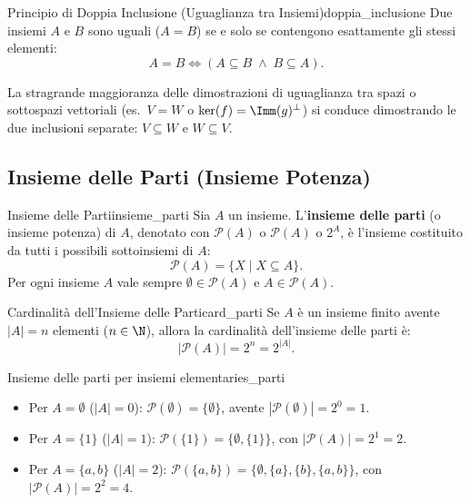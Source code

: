 \begin{teorema}{Principio di Doppia Inclusione (Uguaglianza tra Insiemi)}{doppia_inclusione}
Due insiemi $A$ e $B$ sono uguali ($A = B$) se e solo se contengono esattamente gli stessi elementi:
\begin{equation}
    A = B \iff (A \subseteq B \;\land\; B \subseteq A).
\end{equation}
\end{teorema}
\begin{osservazione}
La stragrande maggioranza delle dimostrazioni di uguaglianza tra spazi o sottospazi vettoriali (es.~$V = W$ o $\ker(f) = \Imm(g)^{\perp}$) si conduce dimostrando le due inclusioni separate: $V \subseteq W$ e $W \subseteq V$.
\end{osservazione}

\subsection{Insieme delle Parti (Insieme Potenza)}

\begin{definizione}{Insieme delle Parti}{insieme_parti}
Sia $A$ un insieme. L'\textbf{insieme delle parti} (o insieme potenza) di $A$, denotato con $\mathcal{P}(A)$ o $\mathscr{P}(A)$ o $2^A$, è l'insieme costituito da tutti i possibili sottoinsiemi di $A$:
\begin{equation}
    \mathcal{P}(A) = \{X \mid X \subseteq A\}.
\end{equation}
Per ogni insieme $A$ vale sempre $\emptyset \in \mathcal{P}(A)$ e $A \in \mathcal{P}(A)$.
\end{definizione}

\begin{proposizione}{Cardinalità dell'Insieme delle Parti}{card_parti}
Se $A$ è un insieme finito avente $|A| = n$ elementi ($n \in \N$), allora la cardinalità dell'insieme delle parti è:
\begin{equation}
    |\mathcal{P}(A)| = 2^n = 2^{|A|}.
\end{equation}
\end{proposizione}

\begin{esempio}{Insieme delle parti per insiemi elementari}{es_parti}
\begin{itemize}
    \item Per $A = \emptyset$ ($|A|=0$): $\mathcal{P}(\emptyset) = \{\emptyset\}$, avente $|\mathcal{P}(\emptyset)| = 2^0 = 1$.
    \item Per $A = \{1\}$ ($|A|=1$): $\mathcal{P}(\{1\}) = \{\emptyset, \{1\}\}$, con $|\mathcal{P}(A)| = 2^1 = 2$.
    \item Per $A = \{a, b\}$ ($|A|=2$): $\mathcal{P}(\{a, b\}) = \{\emptyset, \{a\}, \{b\}, \{a, b\}\}$, con $|\mathcal{P}(A)| = 2^2 = 4$.
\end{itemize}
\end{esempio}

